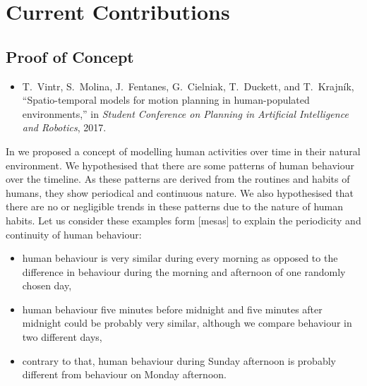 \section{Current Contributions}

\subsection{Proof of Concept}




\begin{itemize}
    \item T.~Vintr, S.~Molina, J.~Fentanes, G.~Cielniak, T.~Duckett, and T.~Krajn{\'i}k, ``Spatio-temporal models for motion planning in human-populated environments,'' in \emph{Student Conference on Planning in Artificial Intelligence and Robotics}, 2017.
\end{itemize}

In \cite{vintr2017spatiotemporal} we proposed a concept of modelling human activities over time in their natural environment.
We hypothesised that there are some patterns of human behaviour over the timeline.
As these patterns are derived from the routines and habits of humans, they show periodical and continuous nature.
We also hypothesised that there are no or negligible trends in these patterns due to the nature of human habits. 
Let us consider these examples form [mesas] to explain the periodicity and continuity of human behaviour:

\begin{itemize}
    \item human  behaviour is very similar during every morning as opposed to the difference in behaviour during the morning and afternoon of one randomly chosen day,
    \item human behaviour five minutes before midnight and five minutes after midnight could be probably very similar, although we compare behaviour in two different days,
    \item contrary to that, human behaviour during Sunday afternoon is probably different from behaviour on Monday afternoon.
\end{itemize}


